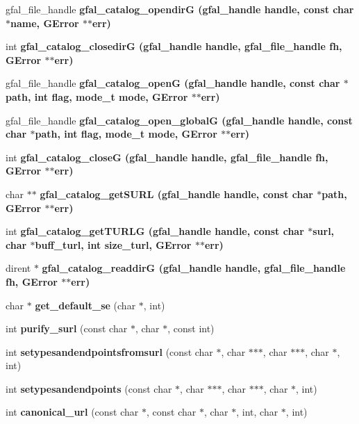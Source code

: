 \begin{CompactItemize}
\item 
gfal\_\-file\_\-handle \bf{gfal\_\-catalog\_\-opendir\-G} (gfal\_\-handle handle, const char $\ast$name, GError $\ast$$\ast$err)
\item 
int \bf{gfal\_\-catalog\_\-closedir\-G} (gfal\_\-handle handle, gfal\_\-file\_\-handle fh, GError $\ast$$\ast$err)
\item 
gfal\_\-file\_\-handle \bf{gfal\_\-catalog\_\-open\-G} (gfal\_\-handle handle, const char $\ast$path, int flag, mode\_\-t mode, GError $\ast$$\ast$err)
\item 
gfal\_\-file\_\-handle \bf{gfal\_\-catalog\_\-open\_\-global\-G} (gfal\_\-handle handle, const char $\ast$path, int flag, mode\_\-t mode, GError $\ast$$\ast$err)
\item 
int \bf{gfal\_\-catalog\_\-close\-G} (gfal\_\-handle handle, gfal\_\-file\_\-handle fh, GError $\ast$$\ast$err)
\item 
char $\ast$$\ast$ \bf{gfal\_\-catalog\_\-get\-SURL} (gfal\_\-handle handle, const char $\ast$path, GError $\ast$$\ast$err)
\item 
int \bf{gfal\_\-catalog\_\-get\-TURLG} (gfal\_\-handle handle, const char $\ast$surl, char $\ast$buff\_\-turl, int size\_\-turl, GError $\ast$$\ast$err)
\item 
dirent $\ast$ \bf{gfal\_\-catalog\_\-readdir\-G} (gfal\_\-handle handle, gfal\_\-file\_\-handle fh, GError $\ast$$\ast$err)
\item 
char $\ast$ \textbf{get\_\-default\_\-se} (char $\ast$, int)\label{gfal__common__catalog_8h_c304a754c49bedeec6c1c9b1445b937d}

\item 
int \textbf{purify\_\-surl} (const char $\ast$, char $\ast$, const int)\label{gfal__common__catalog_8h_c25d6ed82e636c14d640318a2ad5f3b5}

\item 
int \textbf{setypesandendpointsfromsurl} (const char $\ast$, char $\ast$$\ast$$\ast$, char $\ast$$\ast$$\ast$, char $\ast$, int)\label{gfal__common__catalog_8h_f398c539d03eaea6dcb6b45067cb21f2}

\item 
int \textbf{setypesandendpoints} (const char $\ast$, char $\ast$$\ast$$\ast$, char $\ast$$\ast$$\ast$, char $\ast$, int)\label{gfal__common__catalog_8h_f06de10d100ffd8ad880619661708810}

\item 
int \textbf{canonical\_\-url} (const char $\ast$, const char $\ast$, char $\ast$, int, char $\ast$, int)\label{gfal__common__catalog_8h_845c890f2d493921bd587158fab72d65}


\end{CompactItemize}

